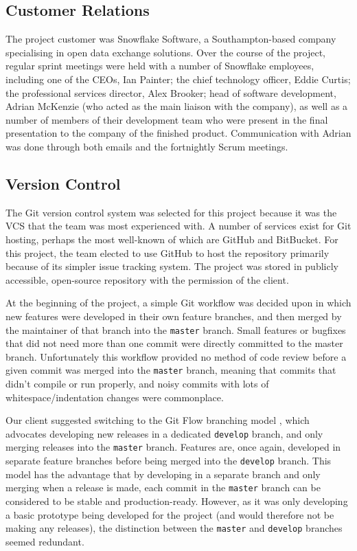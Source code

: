 \documentclass[a4paper, 12pt, twoside]{article}
\begin{document}
\subsection{Customer Relations}
\label{sec:plan_customer_relations}

The project customer was Snowflake Software, a Southampton-based company specialising in open data exchange solutions. Over the course of the project, regular sprint meetings were held with a number of Snowflake employees, including one of the CEOs, Ian Painter; the chief technology officer, Eddie Curtis; the professional services director, Alex Brooker; head of software development, Adrian McKenzie (who acted as the main liaison with the company), as well as a number of members of their development team who were present in the final presentation to the company of the finished product. Communication with Adrian was done through both emails and the fortnightly Scrum meetings.

\subsection{Version Control}
\label{sec:version_control}

The Git version control system was selected for this project because it was the VCS that the team was most experienced with. A number of services exist for Git hosting, perhaps the most well-known of which are GitHub and BitBucket. For this project, the team elected to use GitHub to host the repository primarily because of its simpler issue tracking system. The project was stored in publicly accessible, open-source repository with the permission of the client.

At the beginning of the project, a simple Git workflow was decided upon in which new features were developed in their own feature branches, and then merged by the maintainer of that branch into the \texttt{master} branch. Small features or bugfixes that did not need more than one commit were directly committed to the master branch. Unfortunately this workflow provided no method of code review before a given commit was merged into the \texttt{master} branch, meaning that commits that didn't compile or run properly, and noisy commits with lots of whitespace/indentation changes were commonplace.

Our client suggested switching to the Git Flow branching model \cite{Driessen2010}, which advocates developing new releases in a dedicated \texttt{develop} branch, and only merging releases into the \texttt{master} branch. Features are, once again, developed in separate feature branches before being merged into the \texttt{develop} branch. This model has the advantage that by developing in a separate branch and only merging when a release is made, each commit in the \texttt{master} branch can be considered to be stable and production-ready. However, as it was only developing a basic prototype being developed for the project (and would therefore not be making any releases), the distinction between the \texttt{master} and \texttt{develop} branches seemed redundant.
\end{document}
